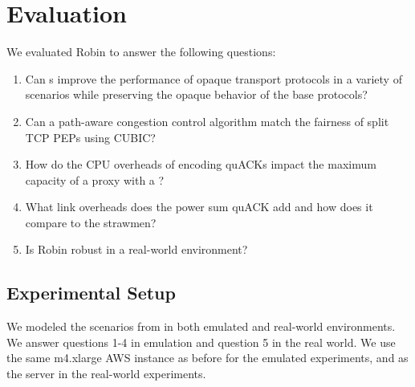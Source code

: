 

\section{Evaluation}
\label{sec:evaluation}



We evaluated Robin to answer the following questions:
\begin{enumerate}[noitemsep,topsep=0pt]
	\item Can {\sys}s improve the performance of opaque transport protocols
	in a variety of scenarios while preserving the opaque behavior of the
	base protocols?
	\item Can a path-aware congestion control algorithm match the fairness of
	split TCP PEPs using CUBIC?
	\item How do the CPU overheads of encoding quACKs impact the maximum
	capacity of a proxy with a \sys?
	\item What link overheads does the power sum quACK add and how does it
	compare to the strawmen?
	\item Is Robin robust in a real-world environment?
\end{enumerate}


\subsection{Experimental Setup}

We modeled the scenarios from  in both
emulated and real-world environments. We answer questions 1-4 in emulation
and question 5 in the real world. We use the same m4.xlarge AWS instance
as before for the emulated experiments, and as the server in the real-world
experiments.

